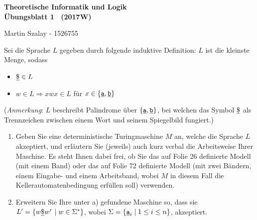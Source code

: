\documentclass[10pt,a4paper]{scrartcl}
\newif\ifLoesung
\newcommand{\ul}[1]{\underline{#1}} %
\newcommand\sy[1]{{\underline{\ifmmode\mathtt{#1}\else\texttt{#1}\fi}}} %
\newcommand\blatt{1}%
\begin{document}
\begin{center}\LARGE\bfseries\sffamily
Theoretische Informatik und Logik\\
Übungsblatt \blatt ~ (2017W)
\ifLoesung\\Lösungen\fi
\end{center}
\medskip

Martin Szalay - 1526755


\begin{question} Sei die Sprache $L$ gegeben durch folgende induktive Definition:
$L$ ist die kleinste Menge, sodass

\begin{itemize}
      \item $\sy \$\in L$
      \item $w\in L \Rightarrow xwx \in L$ f\"ur $x \in \{\sy a, \sy b\}$
\end{itemize}

(\textit{Anmerkung}: $L$ beschreibt Palindrome \"uber $\{\sy a, \sy b\}$, bei welchen das Symbol $\sy \$$ als Trennzeichen zwischen
einem Wort und seinem Spiegelbild fungiert.)

\begin{enumerate}
\item Geben Sie eine deterministische Turingmaschine $M$ an, welche die Sprache $L$ akzeptiert, und erl\"autern Sie (jeweils) 
auch kurz verbal die Arbeitsweise Ihrer Maschine. Es steht Ihnen dabei frei, ob Sie das auf Folie 26 definierte Modell 
(mit einem Band) oder das auf Folie 72 definierte Modell (mit zwei B\"andern, einem Eingabe- und einem Arbeitsband, wobei $M$ 
in diesem Fall die Kellerautomatenbedingung erf\"ullen soll) verwenden.  
 

\item Erweitern Sie Ihre unter a) gefundene Maschine so, dass sie $L'=\{w\sy \$w^r \mid w \in \Sigma^* \}$, 
wobei $\Sigma=\{\sy a_i \mid 1 \le i \le n\}$, akzeptiert. 
 
\end{enumerate}

\end{question}
\end{document}

